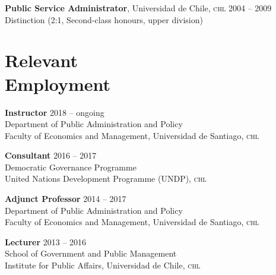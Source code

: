\documentclass[letterpaper,margin]{res}
\begin{document}
\begin{resume}
{\small {\bfseries Public Service Administrator}, Universidad de Chile, {\scshape chl}}  \hfill {\small 2004 -- 2009}\\
{\small Distinction (2:1, Second-class honours, upper division)}



 \section{\footnotesize Relevant \\ Employment}
 
{\bf \small Instructor} \hfill {\small 2018 -- ongoing}\\
{\small Department of Public Administration and Policy}\\
{\small Faculty of Economics and Management, Universidad de Santiago, {\scshape chl}}

{\bf \small Consultant} \hfill {\small 2016 -- 2017}\\
{\small Democratic Governance Programme}\\
{\small United Nations Development Programme ({\scshape UNDP}), {\scshape chl}}

{\small \bf Adjunct Professor} \hfill {\small 2014 -- 2017}\\
{\small Department of Public Administration and Policy}\\
{\small Faculty of Economics and Management, Universidad de Santiago, {\scshape chl}}

{\small \bf Lecturer} \hfill {\small 2013 -- 2016}\\
{\small School of Government and Public Management}\\
{\small Institute for Public Affairs, Universidad de Chile, {\scshape chl}}



\end{resume}
\end{document}
